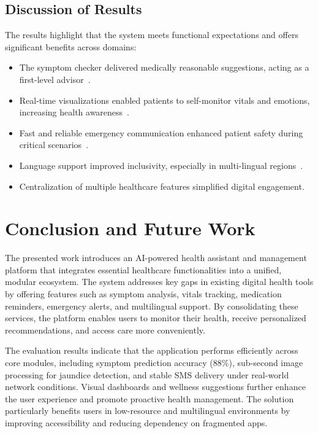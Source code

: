 \documentclass[conference]{IEEEtran}
\begin{document}
\subsection{Discussion of Results}

The results highlight that the system meets functional expectations and offers significant benefits across domains:

\begin{itemize}
    \item The symptom checker delivered medically reasonable suggestions, acting as a first-level advisor~\cite{li2024healthllm}.
    \item Real-time visualizations enabled patients to self-monitor vitals and emotions, increasing health awareness~\cite{banerjee2024literacy}.
    \item Fast and reliable emergency communication enhanced patient safety during critical scenarios~\cite{twilio}.
    \item Language support improved inclusivity, especially in multi-lingual regions~\cite{srivastava2020multilingual}.
    \item Centralization of multiple healthcare features simplified digital engagement.
\end{itemize}


\section{Conclusion and Future Work}

The presented work introduces an AI-powered health assistant and management platform that integrates essential healthcare functionalities into a unified, modular ecosystem. The system addresses key gaps in existing digital health tools by offering features such as symptom analysis, vitals tracking, medication reminders, emergency alerts, and multilingual support. By consolidating these services, the platform enables users to monitor their health, receive personalized recommendations, and access care more conveniently.

The evaluation results indicate that the application performs efficiently across core modules, including symptom prediction accuracy (88\%), sub-second image processing for jaundice detection, and stable SMS delivery under real-world network conditions. Visual dashboards and wellness suggestions further enhance the user experience and promote proactive health management. The solution particularly benefits users in low-resource and multilingual environments by improving accessibility and reducing dependency on fragmented apps.
\end{document}
